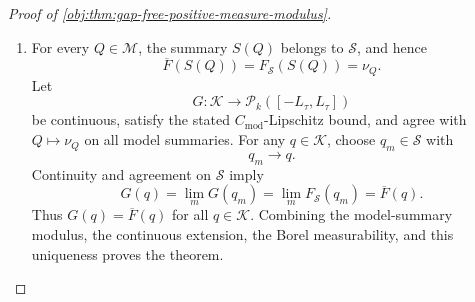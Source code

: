 \documentclass[11pt]{article}
\begin{document}
\begin{proof}[Proof of \cref{obj:thm:gap-free-positive-measure-modulus}]
\begin{enumerate}
It remains to transfer the sharper \(d_S\)-control.  Fix \(q,q'\in\mathcal K\).  Choose sequences \(q_m,q'_m\in\mathscr S\) converging in the ambient metric to \(q,q'\), respectively.  Continuity of \(\overline F\) and \cref{obj:lem:summary-metric-continuity} give
\[
W_1(\overline F(q_m),\overline F(q'_m))
\longrightarrow
W_1(\overline F(q),\overline F(q')),
\qquad
d_S(q_m,q'_m)\longrightarrow d_S(q,q').
\]
For every \(m\), agreement on \(\mathscr S\) and the model-summary control in \cref{eq:gap-free-model-summary-control} yield
\[
W_1(\overline F(q_m),\overline F(q'_m))
=
W_1(F_{\mathscr S}(q_m),F_{\mathscr S}(q'_m))
\le
C_{\mathrm{mod}}d_S(q_m,q'_m).
\]
Passing to the limit proves
\[
W_1(\overline F(q),\overline F(q'))
\le
C_{\mathrm{mod}}d_S(q,q')
\qquad(q,q'\in\mathcal K).
\]
Continuity of \(\overline F\), together with the Borel structure on the quotient atomic-law space, makes \(\overline F\) Borel measurable.

\item For every \(Q\in\mathcal M\), the summary \(S(Q)\) belongs to \(\mathscr S\), and hence
\[
\overline F(S(Q))
=
F_{\mathscr S}(S(Q))
=
\nu_Q .
\]
Let
\[
G:\mathcal K\to\mathcal P_k([-L_\tau,L_\tau])
\]
be continuous, satisfy the stated \(C_{\mathrm{mod}}\)-Lipschitz bound, and agree with \(Q\mapsto\nu_Q\) on all model summaries.  For any \(q\in\mathcal K\), choose \(q_m\in\mathscr S\) with
\[
q_m\to q .
\]
Continuity and agreement on \(\mathscr S\) imply
\[
G(q)
=
\lim_m G(q_m)
=
\lim_m F_{\mathscr S}(q_m)
=
\overline F(q).
\]
Thus \(G(q)=\overline F(q)\) for all \(q\in\mathcal K\).  Combining the model-summary modulus, the continuous extension, the Borel measurability, and this uniqueness proves the theorem.
\end{enumerate}
\end{proof}
\end{document}
